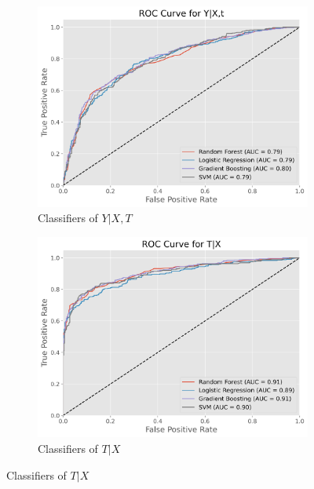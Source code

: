 \documentclass{article}
\newcommand{\gur}[1]{{\color{teal}{Gur: #1}}}
\begin{document}
\begin{figure}
    \centering
    \caption{ROC curves of possible classifiers \gur{change title and subtitles}}
    \label{fig:ROC_curves}
    \begin{subfigure}[b]{0.45\textwidth}
        \centering
        \includegraphics[width=\textwidth]{plots/ROC_curve_Y_given_XT.png}
        \caption{Classifiers of $Y | X, T$}
        \label{fig:ROC_curve_Y_given_XT}
    \end{subfigure}
    \hfill
    \begin{subfigure}[b]{0.45\textwidth}
        \centering
        \includegraphics[width=\textwidth]{plots/ROC_curve_T_given_X.png}
        \caption{Classifiers of $T | X$}
        \label{fig:ROC_curve_T_given_X}
    \end{subfigure}
\end{figure}
\end{document}
